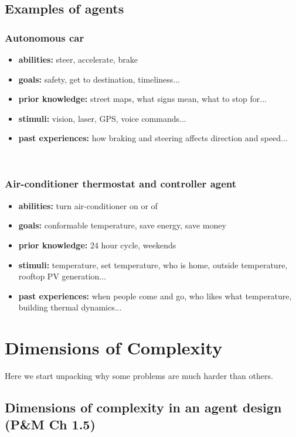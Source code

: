 \documentclass[12pt]{article}
\begin{document}
\newpage
\subsection*{Examples of agents}

\subsubsection*{Autonomous car}
\begin{itemize}
    \item \textbf{abilities:} steer, accelerate, brake
    \item \textbf{goals:}  safety, get to destination, timeliness...
    \item \textbf{prior knowledge:} street maps, what signs mean, what to stop for...
    \item \textbf{stimuli:} vision, laser, GPS, voice commands...
    \item \textbf{past experiences:}  how braking and steering affects direction and speed...
\end{itemize}\\

\subsubsection*{Air-conditioner thermostat and controller agent}
\begin{itemize}
    \item \textbf{abilities:}  turn air-conditioner on or of
    \item \textbf{goals:} conformable temperature, save energy, save money
    \item \textbf{prior knowledge:} 24 hour cycle, weekends
    \item \textbf{stimuli:} temperature, set temperature, who is home, outside temperature, rooftop PV generation...
    \item \textbf{past experiences:} when people come and go, who likes what temperature, building
thermal dynamics...
\end{itemize}

\newpage
\section*{Dimensions of Complexity}

Here we start unpacking why some problems are much harder than others.

\subsection*{Dimensions of complexity in an agent design (P\&M Ch 1.5)}
\end{document}
